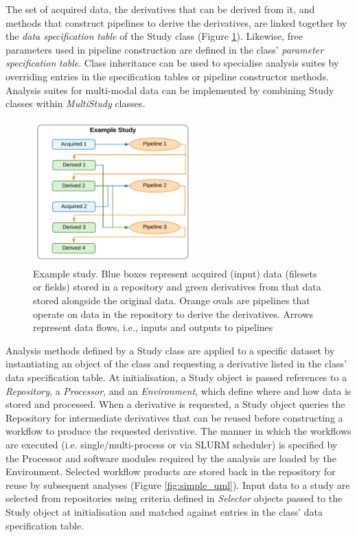\documentclass[smallextended]{svjour3}       %
\begin{document}
The set of acquired data, the derivatives that can be derived from it,
and methods that construct pipelines to derive the derivatives, are
linked together by the \emph{data specification} \emph{table} of the
Study class (Figure \ref{fig:example_study}). Likewise, free parameters used in pipeline
construction are defined in the class' \emph{parameter specification}
\emph{table}. Class inheritance can be used to specialise analysis
suites by overriding entries in the specification tables or pipeline
constructor methods. Analysis suites for multi-modal data can be
implemented by combining Study classes within \emph{MultiStudy}
classes\emph{.}

\begin{figure}
    \centering
    \includegraphics[width=0.55\textwidth]{../figures/example_study}
  \caption{Example study. Blue boxes represent acquired (input)
data (filesets or fields) stored in a repository and green derivatives
from that data stored alongside the original data. Orange ovals are
pipelines that operate on data in the repository to derive the
derivatives. Arrows represent data flows, i.e., inputs and outputs to
pipelines}
\label{fig:example_study}
\end{figure}

Analysis methods defined by a Study class are applied to a
specific dataset by instantiating an object of the class and
requesting a derivative listed in the class' data specification table.
At initialisation, a Study object is passed references to a \emph{Repository},
a \emph{Processor}, and an \emph{Environment}, which
define where and how data is stored and processed. When a derivative is
requested, a Study object queries the Repository for intermediate
derivatives that can be reused before constructing a workflow to produce
the requested derivative. The manner in which the workflows are executed
(i.e. single/multi-process or via SLURM scheduler) is specified by the
Processor and software modules required by the analysis are
loaded by the Environment. Selected workflow products are
stored back in the repository for reuse by subsequent analyses (Figure
\ref{fig:simple_uml}). Input data to a study are selected from repositories
 using criteria defined in \emph{Selector} objects passed to the Study
 object at initialisation and matched against entries in the class' data
specification table.
\end{document}
